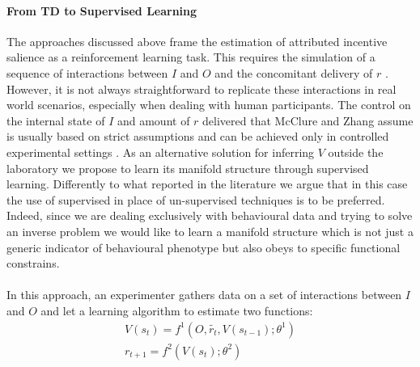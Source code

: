\paragraph{\textbf{From TD to Supervised Learning}}
\label{td_to_supervised}
The approaches discussed above frame the estimation of attributed incentive salience as a reinforcement learning task. This requires the simulation of a sequence of interactions between $I$ and $O$ and the concomitant delivery of $r$  \cite{schultz1997neural,mcclure2003computational,zhang2009neural}. However, it is not always straightforward to replicate these interactions in real world scenarios, especially when dealing with human participants. The control on the internal state of $I$ and amount of $r$ delivered that McClure and Zhang assume is usually based on strict assumptions and can be achieved only in controlled experimental settings \cite{mcclure2003computational,zhang2009neural}. As an alternative solution for inferring $V$ outside the laboratory we propose to learn its manifold structure through supervised learning. Differently to what reported in the literature \cite{calhoun2019unsupervised, mccullough2021unsupervised, luxem2020identifying, pereira2020quantifying, shi2021learning} we argue that in this case the use of supervised in place of un-supervised techniques is to be preferred. Indeed, since we are dealing exclusively with behavioural data and trying to solve an inverse problem  we would like to learn a manifold structure which is not just a generic indicator of behavioural phenotype \cite{luxem2020identifying} but also obeys to specific functional constrains.\\
\\
In this approach, an experimenter gathers data on a set of interactions between $I$ and $O$ and let a learning algorithm to estimate two functions:
\begin{gather}
\label{supervised_v}
    V(s_{t}) = f^{1}(O, \tilde{r_{t}}, V(s_{t-1}); \theta^{1}) \\
    r_{t+1} = f^{2}(V(s_{t}); \theta^{2}) \nonumber
\end{gather}
